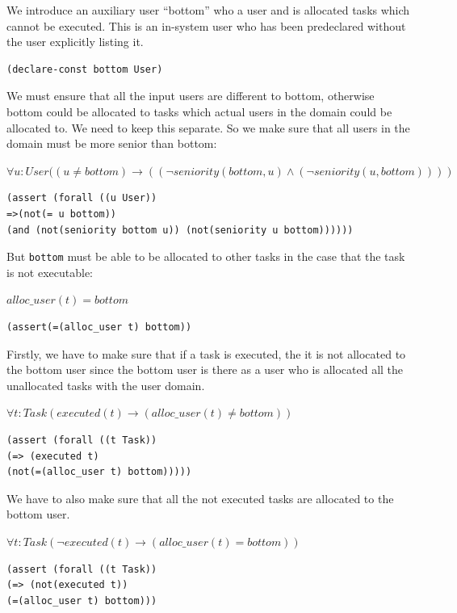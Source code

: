\documentclass[a4paper]{report}
\begin{document}
We introduce an auxiliary user ``bottom'' who a user and is allocated tasks which cannot be executed. This is an in-system user who has been predeclared without the user explicitly listing it.
\begin{lstlisting}[frame=single]
(declare-const bottom User)
\end{lstlisting}
We must ensure that all the input users are different to bottom, otherwise bottom could be allocated to tasks which actual users in the domain could be allocated to. We need to keep this separate. So we make sure that all users in the domain must be more senior than bottom:
\begin{center}
$\forall u : User ((u \neq bottom) \longrightarrow ((\neg seniority(bottom, u) \wedge (\neg seniority(u, bottom))))$
\end{center}
\begin{lstlisting}[frame=single]
(assert (forall ((u User))
=>(not(= u bottom))
(and (not(seniority bottom u)) (not(seniority u bottom))))))
\end{lstlisting}
But \texttt{bottom} must be able to be allocated to other tasks in the case that the task is not executable:
\begin{center}
$alloc\_user(t) = bottom$
\end{center}
\begin{lstlisting}[frame=single]
(assert(=(alloc_user t) bottom))
\end{lstlisting}

Firstly, we have to make sure that if a task is executed, the it is not allocated to the bottom user since the bottom user is there as a user who is allocated all the unallocated tasks with the user domain.
\begin{center}
$\forall t : Task (executed(t) \longrightarrow ( alloc\_user(t) \neq bottom))$
\end{center}
\begin{lstlisting}[frame=single]
(assert (forall ((t Task))
(=> (executed t)
(not(=(alloc_user t) bottom)))))
\end{lstlisting}

We have to also make sure that all the not executed tasks are allocated to the bottom user. 
\begin{center}
$\forall t : Task (\neg executed(t) \longrightarrow (alloc\_user(t) = bottom))$
\end{center}
\begin{lstlisting}[frame=single]
(assert (forall ((t Task))
(=> (not(executed t))
(=(alloc_user t) bottom)))
\end{lstlisting}
\end{document}
